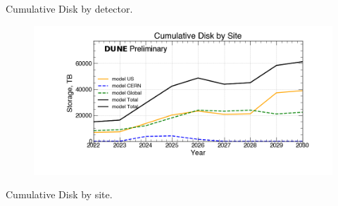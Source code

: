 \begin{table}[h]
\label{tab:DiskByYearByType}
\caption{Cumulative Disk by detector.}
\end{table}
\pagebreak
\begin{figure}[ht]
\centering\includegraphics[height=0.4\textwidth]{NearTerm_2024-08-14-2030_noMWC_Cumulative-Disk-by-Site-Storage.png}\end{figure}
\begin{table}[h]
\label{tab:DiskByYearByType}
\caption{Cumulative Disk by site.}
\end{table}
\pagebreak
